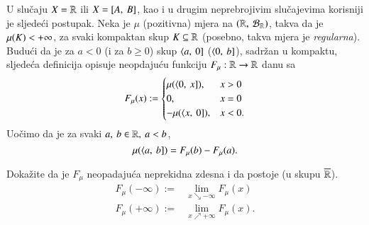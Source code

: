 U slu\v caju $X = \mathbb{R}$ ili $X = [{A}, \:{B}]$, kao i u drugim neprebrojivim slu\v cajevima korisniji je sljede\' ci postupak.
Neka je $\mu$ (pozitivna) mjera na $(\mathbb{R}, \: \mathcal{B}_{\mathbb{R}})$, takva da je $\mu({K}) < +\infty$, za svaki kompaktan skup $K \subseteq \mathbb{R}$ (posebno, takva mjera je \emph{regularna}).
Budu\' ci da je za $a < 0$ (i za $b \geq 0$) skup $\langle {a}, \: {0}]$ ($\langle {0}, \: {b}]$), sadr\v zan u kompaktu, sljede\' ca definicija opisuje neopdaju\' cu funkciju $F_{\mu}: \mathbb{R} \to \mathbb{R}$ danu sa
\begin{equation}    \label{jed:2.13}
    F_{\mu}(x) :=
        \begin{cases}
            \mu({\langle {0}, \: {x}]}), &x > 0\\
            0,   &x = 0\\
            - \mu({\langle {x}, \: {0}]}), &x < 0.
        \end{cases}
\end{equation}
Uo\v cimo da je za svaki $a, \: b \in \mathbb{R}, \: a < b$,
\begin{equation}    \label{jed:2.14}
    \mu({\langle {a}, \: {b}]}) = F_{\mu}(b) - F_{\mu}(a).
\end{equation}

\begin{zad} \label{zad:2.15}
    Doka\v zite da je $F_{\mu}$ neopadaju\' ca neprekidna zdesna i da postoje (u skupu $\overline{\mathbb{R}}$).
    \begin{align*}
        F_{\mu}(-\infty) :=& \lim_{x \searrow -\infty} F_{\mu}(x)\\
        F_{\mu}(+\infty) :=& \lim_{x \nearrow +\infty} F_{\mu}(x).
    \end{align*}
\end{zad}

